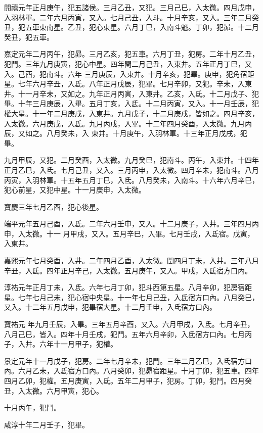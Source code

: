 \begin{pinyinscope}
 開禧元年正月庚午，犯五諸侯。三月乙丑，又犯。三月己巳，入太微。四月戊申，入羽林軍。二年六月丙寅，又入。七月己丑，入斗。十月辛亥，又入。三年二月癸丑，犯五車東南星。乙丑，犯心東星。六月丁巳，入南斗魁。丁卯，犯昴。十二月癸丑，犯五車。



 嘉定元年二月丙午，犯昴。三月乙亥，犯五車。六月丁丑，犯房。二年十月乙丑，犯鬥。三年九月庚寅，犯心中星。四年閏二月己丑，入東井。五年正月丁巳，又入。己酉，犯南斗。六年
 三月庚辰，入東井。十月辛亥，犯畢。庚申，犯角宿距星。七年六月辛丑，入氐。八年正月戊辰，犯畢。七月辛卯，又犯。辛未，入東井。十一月辛未，又如之。九年正月丙寅，入東井。乙亥，入氐。十二月戊子、犯畢。十年三月庚辰，入畢。五月丁亥，入氐。十二月丙寅，又入。十一月壬辰，犯權大星。十一年二月庚戌，入東井。九月戊子，十二月庚戌，皆如之。四月辛亥，入太微。六月庚戌，入氐。九月丙戌，入畢。十二年四月癸酉，入太微。九月丙辰，又如之。八月癸未，入
 東井。十月庚午，入羽林軍。十三年正月戊戌，犯畢。



 九月甲辰，又犯。二月癸酉，入太微。九月癸巳，犯南斗。丙午，入東井。十四年正月乙巳，入氐。七月己丑，又入。三月丙申，入太微。四月辛未，犯南斗。八月丙寅，入羽林軍。十五年五月丁巳，入氐。八月癸未，入南斗。十六年六月辛巳，犯心前星，又犯中星。十一月庚申，入太微。



 寶慶三年七月乙酉，犯心後星。



 端平元年五月己酉，入氐。二年六月壬申，又入。十二月庚子，入井。三年四月丙申，入太微。十一
 月甲戌，又入。五月辛巳，入畢。七月壬戌，入氐宿。戊寅，入東井。



 嘉熙元年七月癸酉，入井。二年四月乙酉，入太微。閏四月丁未，入井。三年八月辛丑，入氐。四年正月辛己，入太微。五月庚午，又入。甲戌，入氐宿方口內。



 淳祐元年正月丁未，入氐。六年七月丁卯，犯斗西第五星。八月辛卯，犯房宿距星。七年七月己未，犯心宿中央星。十一年七月己丑，入氐宿方口內。八月癸巳，又入。十二年五月戊申，犯畢宿大星。十二月壬申，入氐宿方口內。



 寶祐元
 年九月壬辰，入畢。三年五月辛酉，又入。六月甲戌，入氐。七月辛丑，八月己巳，皆入。四年十月壬戌，犯鬥。五年六月辛卯，入氐宿方口內。七月丙子，入井。六年十一月甲子，犯權。



 景定元年十一月戊子，犯房。二年七月辛未，犯鬥。三年二月乙巳，入氐宿方口內。六月乙未，入氐宿方口內。八月癸卯，犯昴宿距星。十月丁卯，犯五車。四年四月乙卯，犯權。五月庚寅，入氐。五年二月甲子，犯房。丁卯，犯鬥。四月癸丑，入太微。六月甲寅，犯心。



 十月丙午，犯鬥。



 咸淳十年二月壬子，犯畢。



\end{pinyinscope}